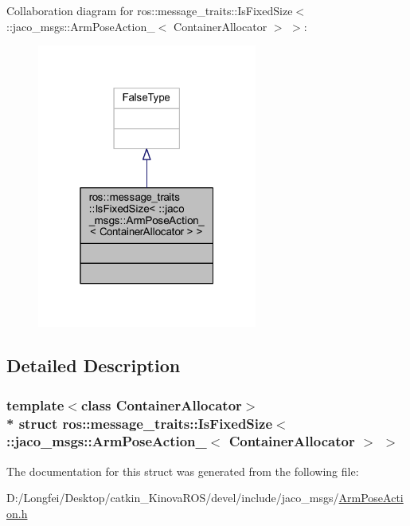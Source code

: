 Collaboration diagram for ros\+:\+:message\+\_\+traits\+:\+:Is\+Fixed\+Size$<$ \+:\+:jaco\+\_\+msgs\+:\+:Arm\+Pose\+Action\+\_\+$<$ Container\+Allocator $>$ $>$\+:
\nopagebreak
\begin{figure}[H]
\begin{center}
\leavevmode
\includegraphics[width=205pt]{d6/d04/structros_1_1message__traits_1_1IsFixedSize_3_01_1_1jaco__msgs_1_1ArmPoseAction___3_01ContainerAllocator_01_4_01_4__coll__graph}
\end{center}
\end{figure}


\subsection{Detailed Description}
\subsubsection*{template$<$class Container\+Allocator$>$\\*
struct ros\+::message\+\_\+traits\+::\+Is\+Fixed\+Size$<$ \+::jaco\+\_\+msgs\+::\+Arm\+Pose\+Action\+\_\+$<$ Container\+Allocator $>$ $>$}



The documentation for this struct was generated from the following file\+:\begin{DoxyCompactItemize}
\item 
D\+:/\+Longfei/\+Desktop/catkin\+\_\+\+Kinova\+R\+O\+S/devel/include/jaco\+\_\+msgs/\hyperlink{ArmPoseAction_8h}{Arm\+Pose\+Action.\+h}\end{DoxyCompactItemize}
